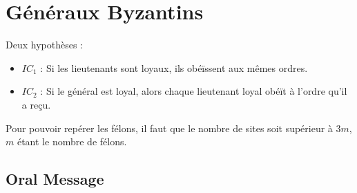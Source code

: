 \documentclass[a4paper, 11pt]{article}
\begin{document}
\section{Généraux Byzantins}

Deux hypothèses :
\begin{itemize}
	\item \underline{$IC_1$} : Si les lieutenants sont loyaux, ils obéïssent aux mêmes ordres.
	\item \underline{$IC_2$} : Si le général est loyal, alors chaque lieutenant loyal obéït à l'ordre
		qu'il a reçu.
\end{itemize}


Pour pouvoir repérer les félons, il faut que le nombre de sites soit supérieur à $3m$, $m$ étant le
nombre de félons.

\subsection{Oral Message}
\end{document}
